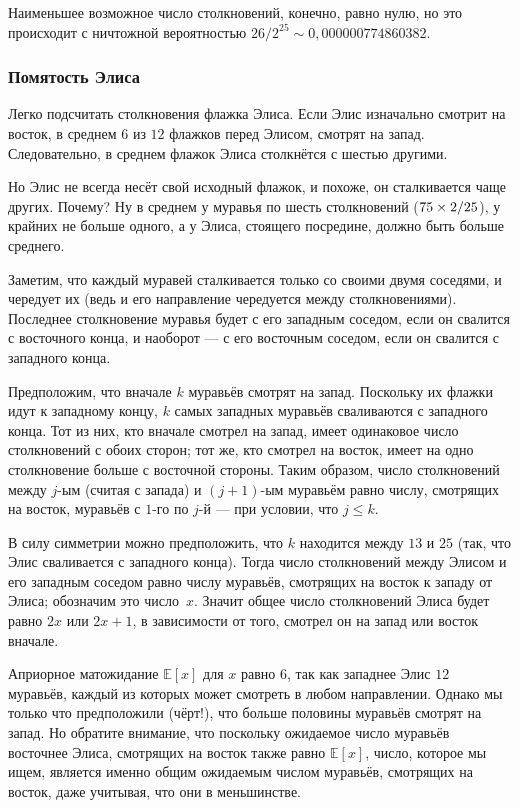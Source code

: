 Наименьшее возможное число столкновений, конечно, равно нулю, но это происходит с ничтожной вероятностью $26/2^{25} \sim 0{,}000000774860382$.


\subsubsection*{Помятость Элиса}

Легко подсчитать столкновения флажка Элиса.
Если Элис изначально смотрит на восток, в среднем $6$ из $12$ флажков перед Элисом, смотрят на запад.
Следовательно, в среднем  флажок Элиса столкнётся с шестью другими.

Но Элис не всегда несёт свой исходный флажок, и похоже, он сталкивается чаще других.
Почему?
Ну в среднем у муравья по шесть столкновений ($75 \z\times 2/25$), у крайних не больше одного, а у Элиса, стоящего посредине, должно быть больше среднего.

Заметим, что каждый муравей сталкивается только со своими двумя соседями,
и чередует их (ведь и его направление чередуется между столкновениями).
Последнее столкновение муравья будет с его западным соседом, если он свалится с восточного конца, и наоборот --- с его восточным соседом, если он свалится с западного конца.

Предположим, что вначале $k$ муравьёв смотрят на запад.
Поскольку их флажки идут к западному концу, $k$ самых западных муравьёв сваливаются с западного конца.
Тот из них, кто вначале смотрел на запад, имеет одинаковое число столкновений с обоих сторон;
тот же, кто смотрел на восток, имеет на одно столкновение больше с восточной стороны.
Таким образом, число столкновений между $j$-ым  (считая с запада) и 
$(j+1)$-ым муравьём равно числу, смотрящих на восток, муравьёв с $1$-го по $j$-й --- при условии, что $j\le k$.

В силу симметрии можно предположить, что $k$ находится между $13$ и $25$ (так, что Элис сваливается с западного конца).
Тогда число столкновений между Элисом и его западным соседом равно числу муравьёв, смотрящих на восток к западу от Элиса; обозначим это число~$x$.
Значит общее число столкновений Элиса будет равно $2x$ или $2x+1$, в зависимости от того, смотрел он на запад или восток вначале.

Априорное матожидание $\mathbb{E}[x]$ для $x$ равно $6$, так как западнее Элис $12$ муравьёв, каждый из которых может смотреть в любом направлении.
Однако мы только что предположили (чёрт!), что больше половины муравьёв смотрят на запад.
Но обратите внимание, что поскольку ожидаемое число муравьёв восточнее Элиса, смотрящих на восток также равно $\mathbb{E}[x]$, число, которое мы ищем, является именно общим ожидаемым числом муравьёв, смотрящих на восток, даже учитывая, что они в меньшинстве.

